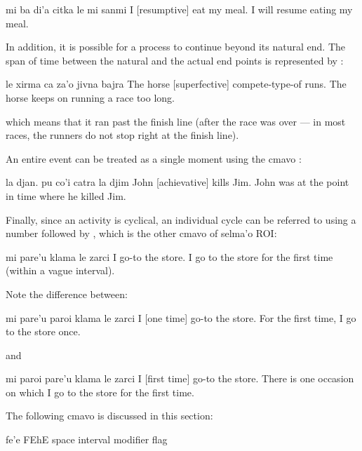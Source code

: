 \begin{example}
mi ba di'a citka le mi sanmi\n
I  [resumptive] eat my meal.\n
I will resume eating my meal.
\end{example}

In addition, it is possible for a process to continue beyond
    its natural end. The span of time between the natural and the
    actual end points is represented by :
\begin{example}
le xirma ca za'o\n
\T	jivna bajra\n
The horse  [superfective]\n
\T	compete-type-of runs.\n
The horse keeps on running a race too long.
\end{example}

{\noindent}which means that it ran past the finish line (after the race
    was over --- in most races, the runners do not stop right at
    the finish line). 

An entire event can be treated as a single moment using the
    cmavo :
\begin{example}
la djan. pu co'i catra la djim\n
John  [achievative] kills Jim.\n
John was at the point in time where he killed Jim.
\end{example}

Finally, since an activity is cyclical, an individual cycle can
    be referred to using a number followed by , which is
    the other cmavo of selma'o ROI:
\begin{example}
mi pare'u klama le zarci\n
I  go-to the store.\n
I go to the store for the first time\n
\T	(within a vague interval).
\end{example}

Note the difference between:
\begin{example}
mi pare'u paroi klama le zarci\n
I  [one time] go-to the store.\n
For the first time, I go to the store once.
\end{example}

{\noindent}and
\begin{example}
mi paroi pare'u klama le zarci\n
I  [first time] go-to the store.\n
There is one occasion on which I go to\n
\T	the store for the first time.
\end{example}



The following cmavo is discussed in this section:

   fe'e    FEhE    space interval modifier flag

